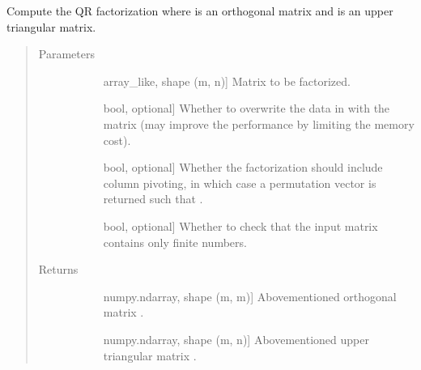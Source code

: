 \documentclass[letterpaper,10pt,english]{sphinxmanual}
\begin{document}
\begin{fulllineitems}
\label{\detokenize{refs/generated/cobyqa.linalg.qr:cobyqa.linalg.qr}}
\sphinxAtStartPar
Compute the QR factorization  where  is an orthogonal
matrix and  is an upper triangular matrix.
\begin{quote}\begin{description}
\item[{Parameters}] \leavevmode\begin{description}
\item[{}] \leavevmode{[}array\_like, shape (m, n){]}
\sphinxAtStartPar
Matrix to be factorized.

\item[{}] \leavevmode{[}bool, optional{]}
\sphinxAtStartPar
Whether to overwrite the data in  with the matrix  (may improve
the performance by limiting the memory cost).

\item[{}] \leavevmode{[}bool, optional{]}
\sphinxAtStartPar
Whether the factorization should include column pivoting, in which case
a permutation vector  is returned such that .

\item[{}] \leavevmode{[}bool, optional{]}
\sphinxAtStartPar
Whether to check that the input matrix contains only finite numbers.

\end{description}

\item[{Returns}] \leavevmode\begin{description}
\item[{}] \leavevmode{[}numpy.ndarray, shape (m, m){]}
\sphinxAtStartPar
Above\sphinxhyphen{}mentioned orthogonal matrix .

\item[{}] \leavevmode{[}numpy.ndarray, shape (m, n){]}
\sphinxAtStartPar
Above\sphinxhyphen{}mentioned upper triangular matrix .


\end{description}
\end{description}
\end{quote}
\end{fulllineitems}
\end{document}
